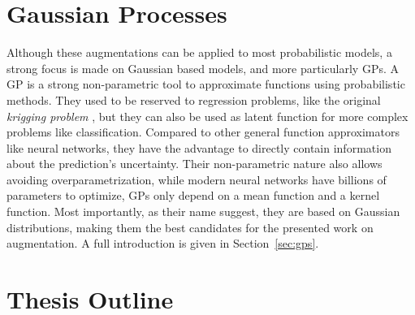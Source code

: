 \section{Gaussian Processes}

Although these augmentations can be applied to most probabilistic models, a strong focus is made on Gaussian based models, and more particularly \acf{GPs}.
A \ac{GP} is a strong non-parametric tool to approximate functions using probabilistic methods.
They used to be reserved to regression problems, like the original \textit{krigging problem} \needcite, but they can also be used as latent function for more complex problems like classification.
Compared to other general function approximators like neural networks, they have the advantage to directly contain information about the prediction's uncertainty.
Their non-parametric nature also allows avoiding overparametrization, while modern neural networks have billions of parameters to optimize, \ac{GPs} only depend on a mean function and a kernel function.
Most importantly, as their name suggest, they are based on Gaussian distributions, making them the best candidates for the presented work on augmentation.
A full introduction is given in Section~\ref{sec:gps}.

\section{Thesis Outline}

